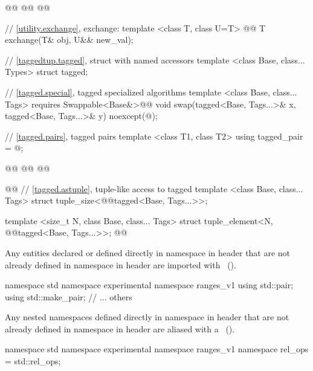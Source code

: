 \begin{codeblock}
@@
  @@
  @@

  // \ref{utility.exchange}, exchange:
  template <class T, class U=T>
    @@
  T exchange(T& obj, U&& new_val);
\end{codeblock}
{\color{addclr}
\begin{codeblock}
  // \ref{taggedtup.tagged}, struct with named accessors
  template <class Base, class... Types> struct tagged;

  // \ref{tagged.special}, tagged specialized algorithms
  template <class Base, class... Tags>
    requires Swappable<Base&>@\newtxt{()}@
  void swap(tagged<Base, Tags...>& x, tagged<Base, Tags...>& y) noexcept(@\seebelow@);

  // \ref{tagged.pairs}, tagged pairs
  template <class T1, class T2> using tagged_pair = @\seebelow@;

  @@
  @@
@\newtxt{\}\}\}}@

@@
  // \ref{tagged.astuple}, tuple-like access to tagged
  template <class Base, class... Tags>
  struct tuple_size<@@tagged<Base, Tags...>>;
  
  template <size_t N, class Base, class... Tags>
  struct tuple_element<N, @@tagged<Base, Tags...>>;
@\newtxt{\}}@
\end{codeblock}
}

{\color{newclr}
\pnum
Any entities declared or defined directly in namespace  in header 
that are not already defined in namespace  in header
 are imported with
~(). \enterexample
\begin{codeblock}
namespace std { namespace experimental { namespace ranges_v1 {
  using std::pair;
  using std::make_pair;
  // ... others
}}}
\end{codeblock}
\exitexample

\pnum
Any nested namespaces defined directly in namespace  in header 
that are not already defined in namespace  in header
 are aliased with a
~(). \enterexample
\begin{codeblock}
namespace std { namespace experimental { namespace ranges_v1 {
  namespace rel_ops = std::rel_ops;
}}}
\end{codeblock}
\exitexample
}

